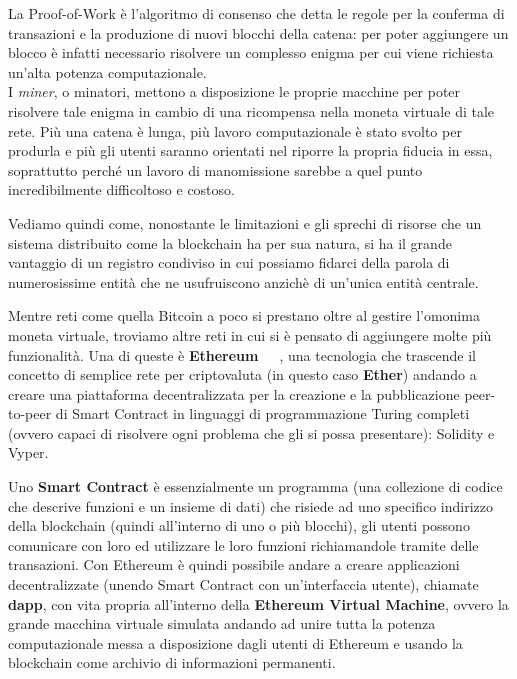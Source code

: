 La Proof-of-Work è l'algoritmo di consenso che detta le regole per 
la conferma di transazioni e la produzione di nuovi blocchi della catena: 
per poter aggiungere un blocco è infatti necessario risolvere un complesso 
enigma per cui viene richiesta un'alta potenza computazionale. \\
I \emph{miner}, o minatori, mettono a disposizione le proprie macchine per poter risolvere tale 
enigma in cambio di una ricompensa nella moneta virtuale di tale rete.
Più una catena è lunga, più lavoro computazionale è stato svolto per produrla e 
più gli utenti saranno orientati nel riporre la propria fiducia in essa, soprattutto 
perché un lavoro di manomissione sarebbe a quel punto incredibilmente difficoltoso e costoso.

Vediamo quindi come, nonostante le limitazioni e gli sprechi di risorse che un sistema 
distribuito come la blockchain ha per sua natura, si ha il grande vantaggio 
di un registro condiviso in cui possiamo fidarci della parola di numerosissime 
entità che ne usufruiscono anzichè di un'unica entità centrale.

\label{sub:eth}
Mentre reti come quella Bitcoin a poco si prestano oltre al gestire l'omonima moneta virtuale, 
troviamo altre reti in cui si è pensato di aggiungere molte più funzionalità.
Una di queste è \textbf{Ethereum}~\cite{ethorg-wp-21}~\cite{eth-21}~\cite{eth-22}, una tecnologia che trascende il concetto di semplice rete 
per criptovaluta (in questo caso \textbf{Ether}) andando a creare una piattaforma 
decentralizzata per la creazione e la pubblicazione peer-to-peer di Smart Contract 
in linguaggi di programmazione Turing completi (ovvero capaci di risolvere ogni problema 
che gli si possa presentare): Solidity e Vyper. 

Uno \textbf{Smart Contract} è essenzialmente un programma (una collezione di codice che descrive 
funzioni e un insieme di dati) che risiede ad uno specifico indirizzo della blockchain 
(quindi all'interno di uno o più blocchi), gli utenti possono comunicare con loro 
ed utilizzare le loro funzioni richiamandole tramite delle transazioni. 
Con Ethereum è quindi possibile andare a creare applicazioni decentralizzate
(unendo Smart Contract con un'interfaccia utente), chiamate \textbf{dapp},
con vita propria all'interno della \textbf{Ethereum Virtual Machine}, ovvero
la grande macchina virtuale simulata andando ad unire tutta la potenza computazionale
messa a disposizione dagli utenti di Ethereum e usando la blockchain come archivio
di informazioni permanenti. 

